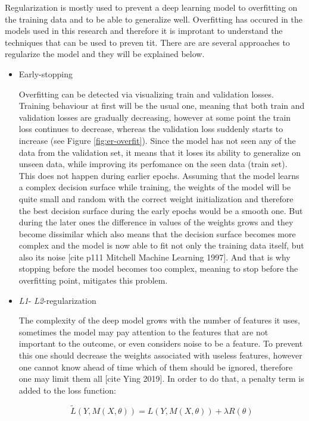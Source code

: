Regularization is mostly used to prevent a deep learning model to overfitting on the training data and to be able to generalize well. Overfitting has occured in the models used in this research and therefore it is improtant to understand the techniques that can be used to preven tit. There are are several approaches to regularize the model and they will be explained below.

\begin{itemize}
	\item Early-stopping

	Overfitting can be detected via visualizing train and validation losses. Training behaviour at first will be the usual one, meaning that both train and validation losses are gradually decreasing, however at some point the train loss continues to decrease, whereas the validation loss suddenly starts to increase (see Figure \ref{fig:er-overfit}). Since the model has not seen any of the data from the validation set, it means that it loses its ability to generalize on unseen data, while improving its perfomance on the seen data (train set). This does not happen during earlier epochs. Assuming that the model learns a complex decision surface while training, the weights of the model will be quite small and random with the correct weight initialization and therefore the best decision surface during the early epochs would be a smooth one. But during the later ones the difference in values of the weights grows and they become dissimilar which also means that the decision surface becomes more complex and the model is now able to fit not only the training data itself, but also its noise [cite p111 Mitchell Machine Learning 1997]. And that is why stopping before the model becomes too complex, meaning to stop before the overfitting point, mitigates this problem.

	\item \emph{L1}- \emph{L2}-regularization

	The complexity of the deep model grows with the number of features it uses, sometimes the model may pay attention to the features that are not important to the outcome, or even considers noise to be a feature. To prevent this one should decrease the weights associated with useless features, however one cannot know ahead of time which of them should be ignored, therefore one may limit them all [cite Ying 2019]. In order to do that, a penalty term is added to the loss function:

	\begin{equation}
	\tilde{L}(Y, M(X, \theta)) = L(Y, M(X, \theta)) + \lambda R(\theta)
	\end{equation}


\end{itemize}
